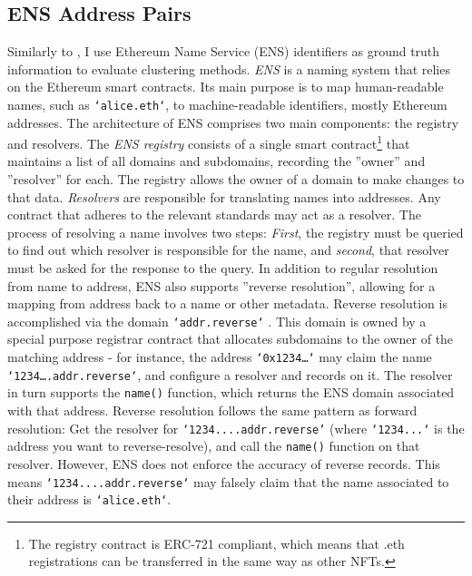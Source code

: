 \documentclass[12pt,a4paper,titlepage,oneside,english]{article}
\begin{document}
\subsection{ENS Address Pairs}
\label{sec:ens}
Similarly to \cite{Beres2020}, I use Ethereum Name Service (ENS) identifiers as ground truth information to evaluate clustering methods.\newline
\textit{ENS} is a naming system that relies on the Ethereum smart contracts. Its main purpose is to map human-readable names, such as \texttt{`alice.eth`}, to machine-readable identifiers, mostly Ethereum addresses. The architecture of ENS comprises two main components: the registry and resolvers. \newline
The \textit{ENS registry} consists of a single smart contract\footnote{The registry contract is ERC-721 compliant, which means that .eth registrations can be transferred in the same way as other NFTs.} that maintains a list of all domains and subdomains, recording the ''owner'' and ''resolver'' for each. The registry allows the owner of a domain to make changes to that data. 
\textit{Resolvers} are responsible for translating names into addresses. Any contract that adheres to the relevant standards may act as a resolver. The process of resolving a name involves two steps: \textit{First}, the registry must be queried to find out which resolver is responsible for the name, and \textit{second}, that resolver must be asked for the response to the query. \citep{ENSdocs} \newline
In addition to regular resolution from name to address, ENS also supports ''reverse resolution'', allowing for a mapping from address back to a name or other metadata. Reverse resolution is accomplished via the %
 domain \texttt{`addr.reverse`}%
. This domain is owned by a special purpose registrar contract that allocates subdomains to the owner of the matching address - for instance, the address \texttt{`0x1234\dots`} may claim the name \texttt{`1234\dots.addr.reverse`}, and configure a resolver and records on it. The resolver in turn supports the \texttt{name()} function, which returns the ENS domain associated with that address.\newline
 Reverse resolution %
 follows the same pattern as forward resolution: Get the resolver for \texttt{`1234....addr.reverse'} (where \texttt{`1234...`} is the address you want to reverse-resolve), and call the \texttt{name()} function on that resolver. However, ENS does not enforce the accuracy of reverse records. This means \texttt{`1234....addr.reverse`} may falsely claim that the name associated to their address is \texttt{`alice.eth`}. 
 
\end{document}
